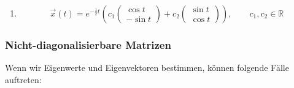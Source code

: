 \begin{enumerate}
\begin{enumerate}
              \item
                    \[
                        \vec{x}(t)
                        = e^{-\frac12 t}
                        \left(
                        c_1 \begin{pmatrix} \cos t \\ -\sin t \end{pmatrix}
                        + c_2 \begin{pmatrix} \sin t \\ \cos t \end{pmatrix}
                        \right),
                        \qquad c_1,c_2\in\mathbb{R}
                    \]
          \end{enumerate}
\end{enumerate}




















\clearpage
\subsubsection{Nicht-diagonalisierbare Matrizen}
Wenn wir Eigenwerte und Eigenvektoren bestimmen, können folgende Fälle auftreten:

